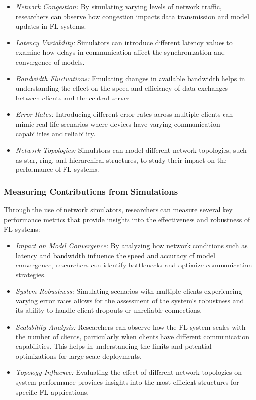 \begin{itemize}
    \item \emph{Network Congestion:} By simulating varying levels of network traffic, researchers can observe how congestion impacts data transmission and model updates in FL systems.
    \item \emph{Latency Variability:} Simulators can introduce different latency values to examine how delays in communication affect the synchronization and convergence of models.
    \item \emph{Bandwidth Fluctuations:} Emulating changes in available bandwidth helps in understanding the effect on the speed and efficiency of data exchanges between clients and the central server.
    \item \emph{Error Rates:} Introducing different error rates across multiple clients can mimic real-life scenarios where devices have varying communication capabilities and reliability.
    \item \emph{Network Topologies:} Simulators can model different network topologies, such as star, ring, and hierarchical structures, to study their impact on the performance of FL systems.
\end{itemize}

\subsubsection{Measuring Contributions from Simulations}

Through the use of network simulators, researchers can measure several key performance metrics that provide insights into the effectiveness and robustness of FL systems:

\begin{itemize}
    \item \emph{Impact on Model Convergence:} By analyzing how network conditions such as latency and bandwidth influence the speed and accuracy of model convergence, researchers can identify bottlenecks and optimize communication strategies.
    \item \emph{System Robustness:} Simulating scenarios with multiple clients experiencing varying error rates allows for the assessment of the system's robustness and its ability to handle client dropouts or unreliable connections.
    \item \emph{Scalability Analysis:} Researchers can observe how the FL system scales with the number of clients, particularly when clients have different communication capabilities. This helps in understanding the limits and potential optimizations for large-scale deployments.
    \item \emph{Topology Influence:} Evaluating the effect of different network topologies on system performance provides insights into the most efficient structures for specific FL applications.
\end{itemize}

